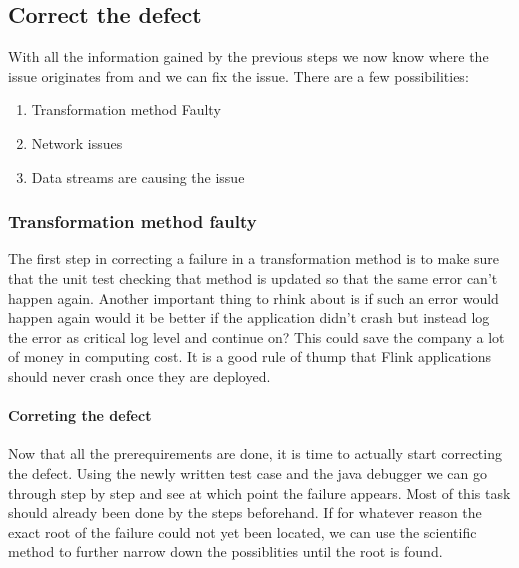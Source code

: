 \subsection{Correct the defect}
With all the information gained by the previous steps we now know where the issue originates from and we can fix the issue. There are a few possibilities:

\begin{enumerate}
  \item[\ref{mdfCorrectTransformation}] Transformation method Faulty
  \item[\ref{mdfCorrectNetwork}] Network issues
  \item[\ref{mdfCorrectDataStreams}] Data streams are causing the issue
\end{enumerate}

\subsubsection{Transformation method faulty}
\label{mdfCorrectTransformation}
The first step in correcting a failure in a transformation method is to make sure that the unit test checking that method is updated so that the same error can't happen again. Another important thing to rhink about is if such an error would happen again would it be better if the application didn't crash but instead log the error as critical log level and continue on? This could save the company a lot of money in computing cost. It is a good rule of thump that Flink applications should never crash once they are deployed.

\paragraph{Correting the defect} Now that all the prerequirements are done, it is time to actually start correcting the defect. Using the newly written test case and the java debugger we can go through step by step and see at which point the failure appears. Most of this task should already been done by the steps beforehand. If for whatever reason the exact root of the failure could not yet been located, we can use the scientific method to further narrow down the possiblities until the root is found.

